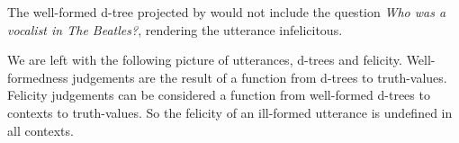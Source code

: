 \documentclass[GPFinal]{subfiles}
\begin{document}
The well-formed d-tree projected by \LLast[b] would not include the question \textit{Who was a vocalist in The Beatles?}, rendering the utterance infelicitous.

We are left with the following picture of utterances, d-trees and felicity.
Well-formedness judgements are the result of a function from d-trees to truth-values.
Felicity judgements can be considered a function from well-formed d-trees to contexts to truth-values.
So the felicity of an ill-formed utterance is undefined in all contexts.
\end{document}
